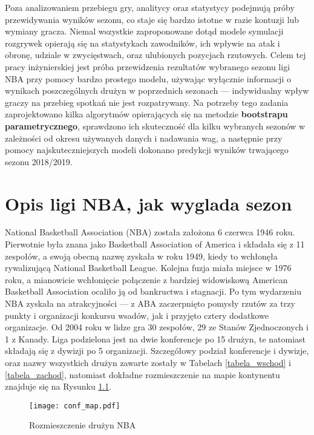 \documentclass[inzynierska]{pwr_wmat_praca_dyplomowa}
\theoremstyle{plain}
\numberwithin{theorem}{chapter}
\theoremstyle{definition}
\numberwithin{theorem}{chapter}
\begin{document}
 Poza analizowaniem przebiegu gry, analitycy oraz statystycy podejmują próby przewidywania wyników sezonu, co staje się bardzo istotne w razie kontuzji lub wymiany gracza. Niemal wszystkie zaproponowane dotąd modele symulacji rozgrywek opierają się na statystykach zawodników, ich wpływie na atak i obronę, udziale w zwycięstwach, oraz ulubionych pozycjach rzutowych. Celem tej pracy inżynierskiej jest próba przewidzenia rezultatów wybranego sezonu ligi NBA przy pomocy bardzo prostego modelu, używając wyłącznie informacji o wynikach poszczególnych drużyn w poprzednich sezonach --- indywidualny wpływ graczy na przebieg spotkań nie jest rozpatrywany. Na potrzeby tego zadania zaprojektowano kilka algorytmów opierających się na metodzie \textbf{bootstrapu parametrycznego}, sprawdzono ich skuteczność dla kilku wybranych sezonów w zależności od okresu używanych danych i nadawania wag, a następnie przy pomocy najskuteczniejszych modeli dokonano predykcji wyników trwającego sezonu 2018/2019. 



\chapter{Opis ligi NBA, jak wyglada sezon}\label{rodzial1}
National Basketball Association (NBA) została założona 6 czerwca 1946 roku. Pierwotnie była znana jako Basketball Association of America i składała się z 11 zespołów, a swoją obecną nazwę zyskała w roku 1949, kiedy to wchłonęła rywalizującą National Basketball League. Kolejna fuzja miała miejsce w 1976 roku, a mianowicie wchłonięcie połączenie z bardziej widowiskową American Basketball Association ocaliło ją od bankructwa i stagnacji. Po tym wydarzeniu NBA zyskała na atrakcyjności --- z ABA zaczerpnięto pomysły rzutów za trzy punkty i organizacji konkursu wsadów, jak i przyjęto cztery dodatkowe organizacje. Od 2004 roku w lidze gra 30 zespołów, 29 ze Stanów Zjednoczonych i 1 z Kanady. Liga podzielona jest na dwie konferencje po 15 drużyn, te natomiast składają się z dywizji po 5 organizacji. Szczegółowy podział konferencje i dywizje, oraz nazwy wszystkich drużyn zawarte zostały w Tabelach \ref{tabela_wschod} i \ref{tabela_zachod}, natomiast dokładne rozmieszczenie na mapie kontynentu znajduje się na Rysunku \ref{mapa_stany}.

\begin{figure}[t]
	\texttt{[image: conf\_map.pdf]}
	\caption{Rozmieszczenie drużyn NBA}\label{mapa_stany}
	\centering
\end{figure}
\end{document}
